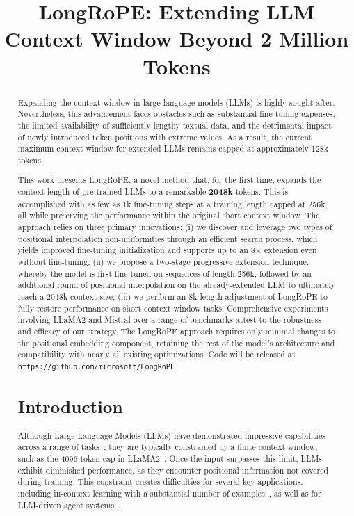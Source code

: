 \title{LongRoPE: Extending LLM Context Window Beyond 2 Million Tokens}

\begin{abstract}
Expanding the context window in large language models (LLMs) is highly sought after. Nevertheless, this advancement faces obstacles such as substantial fine-tuning expenses, the limited availability of sufficiently lengthy textual data, and the detrimental impact of newly introduced token positions with extreme values. As a result, the current maximum context window for extended LLMs remains capped at approximately 128k tokens.

This work presents LongRoPE, a novel method that, for the first time, expands the context length of pre-trained LLMs to a remarkable \textbf{2048k} tokens. This is accomplished with as few as 1k fine-tuning steps at a training length capped at 256k, all while preserving the performance within the original short context window. The approach relies on three primary innovations: (i) we discover and leverage two types of positional interpolation non-uniformities through an efficient search process, which yields improved fine-tuning initialization and supports up to an 8$\times$ extension even without fine-tuning; (ii) we propose a two-stage progressive extension technique, whereby the model is first fine-tuned on sequences of length 256k, followed by an additional round of positional interpolation on the already-extended LLM to ultimately reach a 2048k context size; (iii) we perform an 8k-length adjustment of LongRoPE to fully restore performance on short context window tasks. Comprehensive experiments involving LLaMA2 and Mistral over a range of benchmarks attest to the robustness and efficacy of our strategy. The LongRoPE approach requires only minimal changes to the positional embedding component, retaining the rest of the model’s architecture and compatibility with nearly all existing optimizations. Code will be released at \texttt{https://github.com/microsoft/LongRoPE}

\section{Introduction}

Although Large Language Models (LLMs) have demonstrated impressive capabilities across a range of tasks~\cite{gpt4,llama2}, they are typically constrained by a finite context window, such as the 4096-token cap in LLaMA2~\cite{llama2}. Once the input surpasses this limit, LLMs exhibit diminished performance, as they encounter positional information not covered during training. This constraint creates difficulties for several key applications, including in-context learning with a substantial number of examples~\cite{Huang2023FewerIM}, as well as for LLM-driven agent systems~\cite{park2023generative,madaan2023selfrefine}.


\end{abstract}
